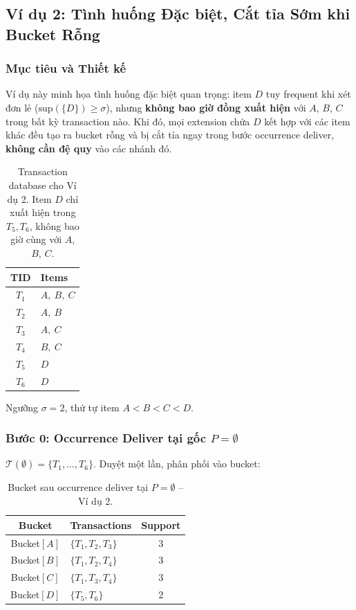 \documentclass[12pt,a4paper]{article}
\theoremstyle{definition}
\begin{document}
\subsection{Ví dụ 2: Tình huống Đặc biệt, Cắt tỉa Sớm khi Bucket Rỗng}
\label{subsec:ex2}

\subsubsection{Mục tiêu và Thiết kế}

Ví dụ này minh họa tình huống đặc biệt quan trọng: item $D$ tuy
frequent khi xét đơn lẻ ($\mathrm{sup}(\{D\}) \geq \sigma$), nhưng
\textbf{không bao giờ đồng xuất hiện} với $A$, $B$, $C$ trong bất kỳ
transaction nào. Khi đó, mọi extension chứa $D$ kết hợp với các item
khác đều tạo ra bucket rỗng và bị cắt tỉa ngay trong bước occurrence
deliver, \textbf{không cần đệ quy} vào các nhánh đó.

\begin{table}[H]
\centering
\begin{tabular}{c l}
    \toprule
    \textbf{TID} & \textbf{Items} \\
    \midrule
    $T_1$ & $A,\ B,\ C$ \\
    $T_2$ & $A,\ B$ \\
    $T_3$ & $A,\ C$ \\
    $T_4$ & $B,\ C$ \\
    $T_5$ & $D$ \\
    $T_6$ & $D$ \\
    \bottomrule
\end{tabular}
\caption{Transaction database cho Ví dụ 2. Item $D$ chỉ xuất hiện
trong $T_5, T_6$, không bao giờ cùng với $A$, $B$, $C$.}
\label{tab:ex2_db}
\end{table}

Ngưỡng $\sigma = 2$, thứ tự item $A < B < C < D$.

\subsubsection{Bước 0: Occurrence Deliver tại gốc $P = \emptyset$}

$\mathcal{T}(\emptyset) = \{T_1,\ldots,T_6\}$.
Duyệt một lần, phân phối vào bucket:

\begin{table}[H]
\centering
\begin{tabular}{c l c}
    \toprule
    \textbf{Bucket} & \textbf{Transactions} & \textbf{Support} \\
    \midrule
    Bucket$[A]$ & $\{T_1, T_2, T_3\}$ & $3$ \\
    Bucket$[B]$ & $\{T_1, T_2, T_4\}$ & $3$ \\
    Bucket$[C]$ & $\{T_1, T_3, T_4\}$ & $3$ \\
    Bucket$[D]$ & $\{T_5, T_6\}$       & $2$ \\
    \bottomrule
\end{tabular}
\caption{Bucket sau occurrence deliver tại $P=\emptyset$ -- Ví dụ 2.}
\label{tab:ex2_bucket_root}
\end{table}
\end{document}
